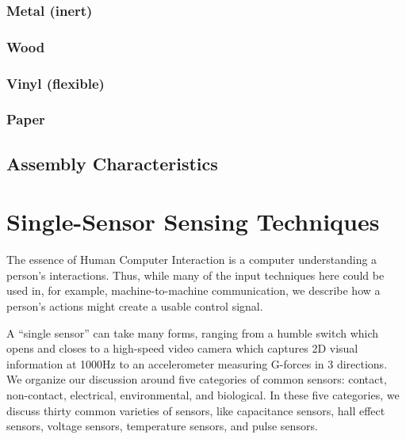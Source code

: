 \subsubsection{Metal (inert)}

\subsubsection{Wood}

\subsubsection{Vinyl (flexible)}

\subsubsection{Paper}

\subsection{Assembly Characteristics}

\section{Single-Sensor Sensing Techniques}

The essence of Human Computer Interaction is a computer understanding a person's interactions. Thus, while many of the input techniques here could be used in, for example, machine-to-machine communication, we describe how a person's actions might create a usable control signal.

A ``single sensor'' can take many forms, ranging from a humble switch which opens and closes to a high-speed video camera which captures 2D visual information at 1000Hz to an accelerometer measuring G-forces in 3 directions.
We organize our discussion around five categories of common sensors: contact, non-contact, electrical, environmental, and biological. In these five categories, we discuss thirty common varieties of sensors, like capacitance sensors, hall effect sensors, voltage sensors, temperature sensors, and pulse sensors.

